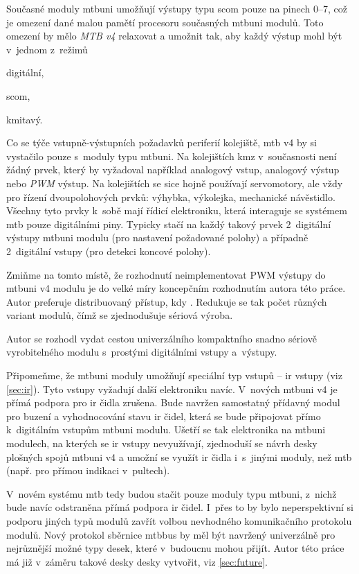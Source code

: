 Současné moduly \gls{mtbuni} umožňují výstupy typu \gls{scom} pouze na pinech
0–7, což je omezení dané malou pamětí procesoru současných \gls{mtbuni} modulů.
Toto omezení by mělo \textit{MTB v4} relaxovat a umožnit tak, aby každý výstup
mohl být v~jednom z~režimů

\begin{compactenum}
\item digitální,
\item \gls{scom},
\item kmitavý.
\end{compactenum}

Co se týče vstupně-výstupních požadavků periferií kolejiště, \gls{mtb} v4 by
si vystačilo pouze s~moduly typu \gls{mtbuni}. Na kolejištích \gls{kmz}
v~současnosti není žádný prvek, který by vyžadoval například analogový vstup,
analogový výstup nebo \textit{PWM} výstup. Na kolejištích se sice hojně
používají servomotory, ale vždy pro řízení dvoupolohových prvků: výhybka,
výkolejka, mechanické návěstidlo. Všechny tyto prvky k~sobě mají řídicí
elektroniku, která interaguje se systémem \gls{mtb} pouze digitálními piny.
Typicky stačí na každý takový prvek 2~digitální výstupy \gls{mtbuni} modulu
(pro nastavení požadované polohy) a případně 2~digitální vstupy (pro detekci
koncové polohy).

Zmiňme na tomto místě, že rozhodnutí neimplementovat PWM výstupy do
\gls{mtbuni} v4 modulu je do velké míry koncepčním rozhodnutím autora této
práce. Autor preferuje distribuovaný přístup, kdy . Redukuje se tak počet různých variant modulů, čímž
se zjednodušuje sériová výroba.

Autor se rozhodl vydat cestou univerzálního
kompaktního snadno sériově vyrobitelného modulu s~prostými digitálními vstupy
a~výstupy.

Připomeňme, že \gls{mtbuni} moduly umožňují speciální typ vstupů – \gls{ir} vstupy
(viz \ref{sec:ir}). Tyto vstupy vyžadují další elektroniku navíc.  V~nových
\gls{mtbuni} v4 je přímá podpora pro \gls{ir} čidla zrušena. Bude navržen
samostatný přídavný modul pro buzení a vyhodnocování stavu \gls{ir} čidel,
která se bude připojovat přímo k~digitálním vstupům \gls{mtbuni} modulu. Ušetří
se tak elektronika na \gls{mtbuni} modulech, na kterých se \gls{ir} vstupy
nevyužívají, zjednoduší se návrh desky plošných spojů \gls{mtbuni} v4 a umožní
se využít \gls{ir} čidla i~s~jinými moduly, než \gls{mtb} (např. pro přímou
indikaci v~pultech).

V~novém systému \gls{mtb} tedy budou stačit pouze moduly typu \gls{mtbuni},
z~nichž bude navíc odstraněna přímá podpora \gls{ir} čidel. I~přes to by bylo
neperspektivní si podporu jiných typů modulů zavřít volbou nevhodného
komunikačního protokolu modulů. Nový protokol sběrnice \gls{mtbbus} by měl být
navržený univerzálně pro nejrůznější možné typy desek, které v~budoucnu mohou
přijít.  Autor této práce má již v~záměru takové desky desky vytvořit, viz
\ref{sec:future}.


